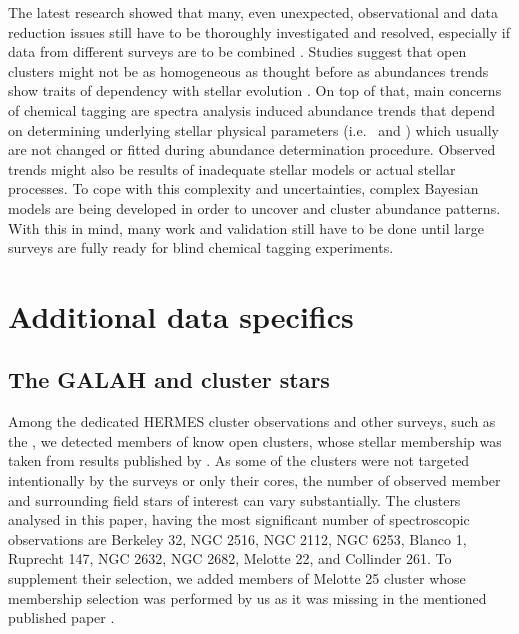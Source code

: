 The latest research showed that many, even unexpected, observational and data reduction issues still have to be thoroughly investigated and resolved, especially if data from different surveys are to be combined \citep{2019ARA&A..57..571J}. Studies suggest that open clusters might not be as homogeneous as thought before \citep{2016ApJ...817...49B, 2018MNRAS.473.4612K} as abundances trends show traits of dependency with stellar evolution \citep{2015A&A...577A..47B, 2017ApJ...840...99D, 2018MNRAS.478..425B}. On top of that, main concerns of chemical tagging are spectra analysis induced abundance trends \citep{2016ApJ...817...49B, 2019arXiv191208539C, 2020arXiv200103179B} that depend on determining underlying stellar physical parameters (i.e. \Teff\ and \vsin) which usually are not changed or fitted during abundance determination procedure. Observed trends might also be results of inadequate stellar models or actual stellar processes. To cope with this complexity and uncertainties, complex Bayesian models are being developed \citep{2016ApJ...817...49B, 2019ApJ...887...73C} in order to uncover and cluster abundance patterns. With this in mind, many work and validation still have to be done until large surveys are fully ready for blind chemical tagging experiments. 

\section{Additional data specifics}
\label{sec:data_clusters}

\subsection{The GALAH and cluster stars}
\label{sec:galah_clusters}
Among the dedicated HERMES cluster observations and other surveys, such as the \Gh, we detected members of know open clusters, whose stellar membership was taken from results published by \citet{2018A&A...618A..93C}. As some of the clusters were not targeted intentionally by the surveys or only their cores, the number of observed member and surrounding field stars of interest can vary substantially. The clusters analysed in this paper, having the most significant number of spectroscopic observations are Berkeley 32, NGC 2516, NGC 2112, NGC 6253, Blanco 1, Ruprecht 147, NGC 2632, NGC 2682,  Melotte 22, and Collinder 261. To supplement their selection, we added members of Melotte 25 cluster whose membership selection was performed by us as it was missing in the mentioned published paper \cite{2018A&A...618A..93C}. 

